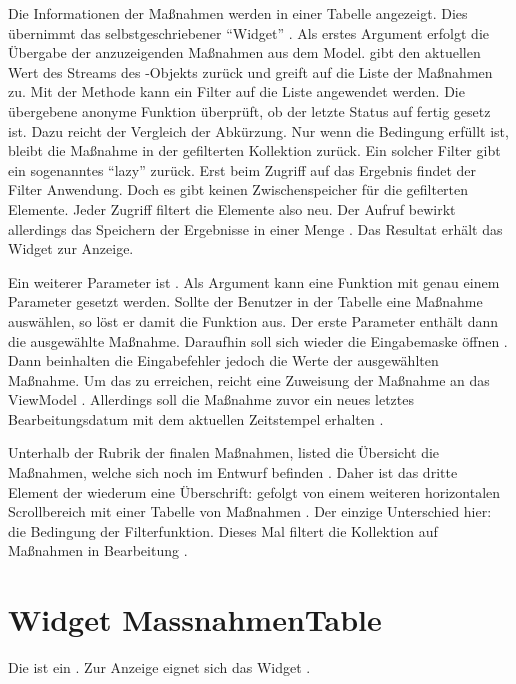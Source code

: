 Die Informationen der Maßnahmen werden in einer Tabelle angezeigt.
Dies übernimmt das selbstgeschriebener \enquote{Widget}  .
Als erstes Argument erfolgt die Übergabe der anzuzeigenden Maßnahmen aus dem Model.  gibt den aktuellen Wert des Streams des -Objekts zurück und greift auf die Liste der Maßnahmen zu. Mit der Methode   kann ein Filter auf die Liste angewendet werden. Die übergebene anonyme Funktion    überprüft, ob der letzte Status auf fertig gesetz ist. Dazu reicht der Vergleich der Abkürzung. Nur wenn die Bedingung erfüllt ist, bleibt die Maßnahme in der gefilterten Kollektion zurück. Ein solcher Filter gibt ein sogenanntes \enquote{lazy}  zurück. Erst beim Zugriff auf das Ergebnis findet der Filter Anwendung. Doch es gibt keinen Zwischenspeicher für die gefilterten Elemente. Jeder Zugriff filtert die Elemente also neu. Der Aufruf  bewirkt allerdings das Speichern der Ergebnisse in einer Menge . Das Resultat erhält das Widget  zur Anzeige.

Ein weiterer Parameter ist  .
Als Argument kann eine Funktion mit genau einem Parameter gesetzt werden.
Sollte der Benutzer in der Tabelle eine Maßnahme auswählen, so löst er damit die Funktion aus.
Der erste Parameter enthält dann die ausgewählte Maßnahme.
Daraufhin soll sich wieder die Eingabemaske öffnen .
Dann beinhalten die Eingabefehler jedoch die Werte der ausgewählten Maßnahme.  Um das zu erreichen, reicht eine Zuweisung der Maßnahme an das ViewModel . Allerdings soll die Maßnahme zuvor ein neues letztes Bearbeitungsdatum mit dem aktuellen Zeitstempel erhalten .

Unterhalb der Rubrik der finalen Maßnahmen, listed die Übersicht die Maßnahmen, welche sich noch im Entwurf befinden .
Daher ist das dritte Element der  wiederum eine Überschrift:   gefolgt von einem weiteren horizontalen Scrollbereich  mit einer Tabelle von Maßnahmen .
Der einzige Unterschied hier: die Bedingung der Filterfunktion.
Dieses Mal filtert die Kollektion auf Maßnahmen in Bearbeitung .


\section{Widget MassnahmenTable}

Die  ist ein   .
Zur Anzeige eignet sich das Widget  . 



